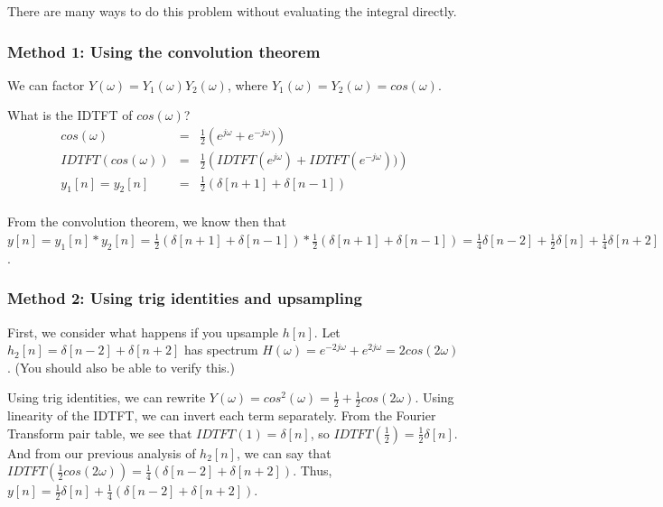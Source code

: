 \documentclass[11pt]{article}
\begin{document}
{\color{blue}
There are many ways to do this problem without evaluating the integral directly.


\subsubsection*{Method 1: Using the convolution theorem} 

We can factor $Y(\omega) = Y_1(\omega)Y_2(\omega)$, where $Y_1(\omega) = Y_2(\omega) = cos(\omega)$.

What is the IDTFT of $cos(\omega)$? 
\begin{eqnarray*}
cos(\omega) &=& \frac{1}{2}\left(e^{j\omega}+e^{-j\omega}) \right) \\
IDTFT(cos(\omega)) &=& \frac{1}{2}\left(IDTFT(e^{j\omega})+IDTFT(e^{-j\omega})) \right) \\
y_1[n] = y_2[n] &=& \frac{1}{2}\left(\delta[n+1]+\delta[n-1] \right) \\
\end{eqnarray*}

From the convolution theorem, we know then that $y[n] = y_1[n]*y_2[n] = \frac{1}{2}\left(\delta[n+1]+\delta[n-1] \right) * \frac{1}{2}\left(\delta[n+1]+\delta[n-1] \right) = \frac{1}{4}\delta[n-2] + \frac{1}{2}\delta[n] + \frac{1}{4}\delta[n+2] $.


\subsubsection*{Method 2: Using trig identities and upsampling}

First, we consider what happens if you upsample $h[n]$. Let $h_2[n] = \delta[n-2]+\delta[n+2]$ has spectrum $H(\omega) = e^{-2j\omega}+e^{2j\omega}=2cos(2\omega)$. (You should also be able to verify this.)

Using trig identities, we can rewrite $Y(\omega) = cos^2(\omega) = \frac{1}{2} +\frac{1}{2}cos(2\omega)$. Using linearity of the IDTFT, we can invert each term separately. 
From the Fourier Transform pair table, we see that $IDTFT(1) = \delta[n]$, so $IDTFT\left(\frac{1}{2} \right) = \frac{1}{2}\delta[n]$. 
And from our previous analysis of $h_2[n]$, we can say that $IDTFT\left(\frac{1}{2}cos(2\omega)\right) = \frac{1}{4}\left(\delta[n-2]+\delta[n+2] \right)$. 
Thus, $y[n] = \frac{1}{2}\delta[n] + \frac{1}{4}\left(\delta[n-2]+\delta[n+2] \right)$.

}
\end{document}
